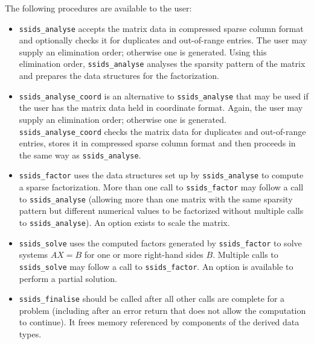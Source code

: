 \documentclass{spral}
\begin{document}
\noindent
The following procedures are available to the user:
\begin{itemize}
\item {\tt ssids\_analyse} accepts the matrix data in compressed
sparse column format and optionally checks it for duplicates and  out-of-range entries.
The user may supply an elimination order; otherwise
one is generated. Using this elimination order,
{\tt ssids\_analyse}  analyses the sparsity pattern of
the matrix and prepares the data structures for the factorization.

 \item {\tt ssids\_analyse\_coord} is an alternative to
{\tt ssids\_analyse} that may be used if the user has
the matrix data held in coordinate
format. Again, the user may supply an elimination order; otherwise
one is generated. {\tt ssids\_analyse\_coord}
checks the matrix data  for duplicates and  out-of-range entries,
stores
it in compressed sparse column format and then proceeds
in the same way as {\tt ssids\_analyse}.

\item {\tt ssids\_factor} uses the data structures
set up by {\tt ssids\_analyse} to compute a sparse
factorization. More than one call to  {\tt ssids\_factor}
may follow a call to {\tt ssids\_analyse} (allowing more than
one matrix with the same sparsity pattern but different
numerical values to be factorized without multiple calls to
{\tt ssids\_analyse}).
An option exists to scale the matrix.

\item {\tt ssids\_solve} uses the computed factors generated
by  {\tt ssids\_factor}
to solve systems ${AX= B}$
for one or more right-hand sides $B$.
Multiple calls to {\tt ssids\_solve} may follow a call to
{\tt ssids\_factor}.
An option is available to perform a partial solution.

\item {\tt ssids\_finalise} should be called after all other calls
are complete for a problem (including after an error
return that does not allow the computation
to continue). It frees memory referenced by components of
the derived data types.
\end{itemize}
\end{document}
